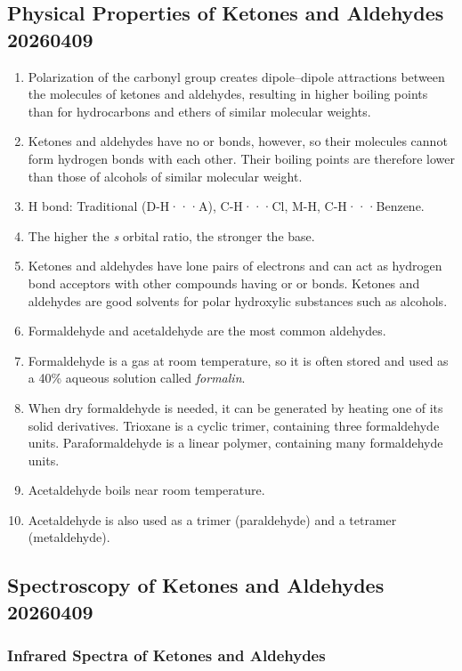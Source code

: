 \subsection{Physical Properties of Ketones and Aldehydes 20260409}

\begin{enumerate}
    \item Polarization of the carbonyl group creates dipole–dipole attractions between the molecules of ketones and aldehydes, resulting in higher boiling points than for hydrocarbons and ethers of similar molecular weights.
    \item Ketones and aldehydes have no  or  bonds, however, so their molecules cannot form hydrogen bonds with each other. Their boiling points are therefore lower than those of alcohols of similar molecular weight.
    \item H bond: Traditional (D-H···A), C-H···Cl, M-H, C-H···Benzene.
    \item The higher the \textit{s} orbital ratio, the stronger the base.
    \item Ketones and aldehydes have lone pairs of electrons and can act as hydrogen bond acceptors with other compounds having or  or  bonds. Ketones and aldehydes are good solvents for polar hydroxylic substances such as alcohols.
    \item Formaldehyde and acetaldehyde are the most common aldehydes.
    \item Formaldehyde is a gas at room temperature, so it is often stored and used as a 40\% aqueous solution called \textit{formalin}.
    \item When dry formaldehyde is needed, it can be generated by heating one of its solid derivatives. Trioxane is a cyclic trimer, containing three formaldehyde units. Paraformaldehyde is a linear polymer, containing many formaldehyde units.
    \item Acetaldehyde boils near room temperature.
    \item Acetaldehyde is also used as a trimer (paraldehyde) and a tetramer (metaldehyde).
\end{enumerate}

\subsection{Spectroscopy of Ketones and Aldehydes 20260409}

\subsubsection{Infrared Spectra of Ketones and Aldehydes}

